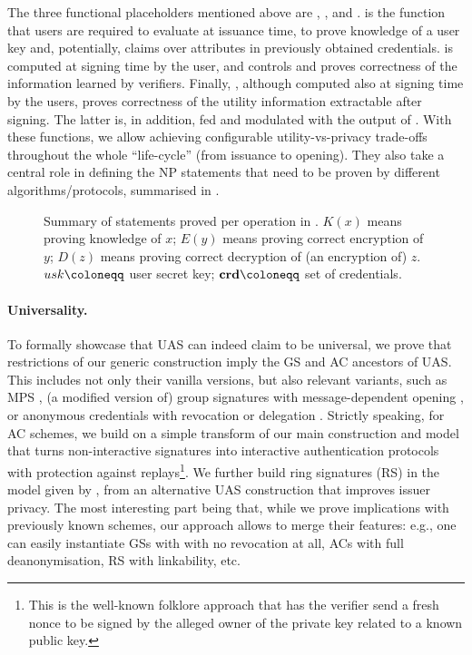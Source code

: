 The three functional placeholders mentioned above are \fissue, \feval, and
\finsp. \fissue is the function that users are required to evaluate at issuance
time, to prove knowledge of a user key and, potentially, claims over attributes
in previously obtained credentials. \feval is computed at signing time by the
user, and controls and proves correctness of the information learned by
verifiers. Finally, \finsp, although  computed also at signing time by the
users, proves correctness of the utility information extractable after signing.
The latter is, in addition, fed and modulated with the output of \feval. With
these functions, we allow achieving configurable utility-vs-privacy trade-offs
throughout the whole ``life-cycle'' (from issuance to opening). They also take
a central role in defining the NP statements that need to be proven by different
algorithms/protocols, summarised in .

\begin{figure}[ht!]
  \centering
  \scalebox{0.85}{
    
  }
  \caption{Summary of statements proved per operation in \UAS.
    $K(x)$ means proving knowledge of $x$; $E(y)$ means proving correct
    encryption of $y$; $D(z)$ means proving correct decryption of (an encryption
    of) $z$. $\usk \coloneqq$ user secret key; $\scred \coloneqq$ set of
    credentials.}
  \label{fig:proof-blocks-uas}
\end{figure}

\paragraph{Universality.}
To formally showcase that UAS can indeed claim to be universal, we prove that
restrictions of our generic construction imply the GS and AC ancestors of UAS.
This includes not only their vanilla versions, but also relevant variants,
such as MPS \cite{ngsy22}, (a modified version of) group signatures with
message-dependent opening \cite{seh+12}, or anonymous credentials with
revocation \cite{cks10} or delegation \cite{bcc+09}.
%
Strictly speaking, for AC schemes, we build on a simple transform of our main
construction and model that turns non-interactive signatures into interactive
authentication protocols with protection against replays\footnote{This is
  the well-known folklore approach that has the verifier send a fresh nonce to
  be signed by the alleged owner of the private key related to a known
  public key.}. We further build ring signatures (RS) in the model given by
\cite{bkm06}, from an alternative UAS construction that improves issuer privacy.
%
The most interesting part being that, while we prove implications with
previously known schemes, our approach allows to merge their features: e.g.,
one can easily instantiate GSs with with no revocation at all, ACs
with full deanonymisation, RS with linkability, etc.

